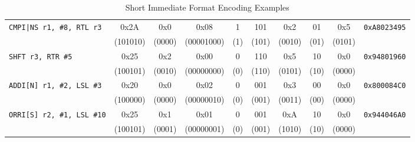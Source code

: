 \begin{table}[H]
\begin{tabular}{lccccccccc}
		\midrule
		\texttt{CMPI|NS r1, \#8, RTL r3}   & 0x2A        & 0x0          & 0x08         & 1           & 101         & 0x2         & 01          & 0x5           & \texttt{0xA8023495} \\
		                                   & (101010)    & (0000)       & (00001000)   & (1)         & (101)       & (0010)      & (01)        & (0101)        &                     \\
		\midrule
		\texttt{SHFT r3, RTR \#5}          & 0x25        & 0x2          & 0x00         & 0           & 110         & 0x5         & 10          & 0x0           & \texttt{0x94801960} \\
		                                   & (100101)    & (0010)       & (00000000)   & (0)         & (110)       & (0101)      & (10)        & (0000)        &                     \\
		\midrule
		\texttt{ADDI[N] r1, \#2, LSL \#3}  & 0x20        & 0x0          & 0x02         & 0           & 001         & 0x3         & 00          & 0x0           & \texttt{0x800084C0} \\
		                                   & (100000)    & (0000)       & (00000010)   & (0)         & (001)       & (0011)      & (00)        & (0000)        &                     \\
		\midrule
		\texttt{ORRI[S] r2, \#1, LSL \#10} & 0x25        & 0x1          & 0x01         & 0           & 001         & 0xA         & 10          & 0x0           & \texttt{0x944046A0} \\
		                                   & (100101)    & (0001)       & (00000001)   & (0)         & (001)       & (1010)      & (10)        & (0000)        &                     \\
		\bottomrule
	\end{tabular}
	\caption{Short Immediate Format Encoding Examples}
	\label{tab:short-imm-format-examples}
\end{table}
